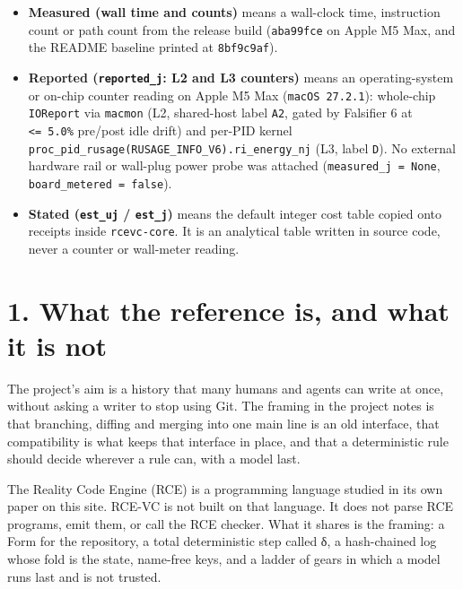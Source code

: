 \documentclass[10pt,letterpaper]{article}
\providecommand{\tightlist}{\setlength{\itemsep}{1pt}\setlength{\parskip}{0pt}}
\begin{document}
\begin{itemize}
\tightlist
\item
  \textbf{Measured (wall time and counts)} means a wall-clock time,
  instruction count or path count from the release build
  (\texttt{aba99fce} on Apple M5 Max, and the README baseline printed at
  \texttt{8bf9c9af}).
\item
  \textbf{Reported (\texttt{reported\_j}: L2 and L3 counters)} means an
  operating-system or on-chip counter reading on Apple M5 Max
  (\texttt{macOS\ 27.2.1}): whole-chip \texttt{IOReport} via
  \texttt{macmon} (L2, shared-host label \texttt{A2}, gated by Falsifier
  6 at \texttt{\textless{}=\ 5.0\%} pre/post idle drift) and per-PID
  kernel \texttt{proc\_\allowbreak{}pid\_\allowbreak{}rusage(\allowbreak{}RUSAGE\_\allowbreak{}INFO\_\allowbreak{}V6).\allowbreak{}ri\_\allowbreak{}energy\_\allowbreak{}nj}
  (L3, label \texttt{D}). No external hardware rail or wall-plug power
  probe was attached (\texttt{measured\_\allowbreak{}j\ =\ None},
  \texttt{board\_\allowbreak{}metered\ =\ false}).
\item
  \textbf{Stated (\texttt{est\_uj} / \texttt{est\_j})} means the default
  integer cost table copied onto receipts inside \texttt{rcevc-core}. It
  is an analytical table written in source code, never a counter or
  wall-meter reading.
\end{itemize}

\section{1. What the reference is, and what it is
not}\label{what-the-reference-is-and-what-it-is-not}

The project's aim is a history that many humans and agents can write at
once, without asking a writer to stop using Git. The framing in the
project notes is that branching, diffing and merging into one main line
is an old interface, that compatibility is what keeps that interface in
place, and that a deterministic rule should decide wherever a rule can,
with a model last.

The Reality Code Engine (RCE) is a programming language studied in its
own paper on this site. RCE-VC is not built on that language. It does
not parse RCE programs, emit them, or call the RCE checker. What it
shares is the framing: a Form for the repository, a total deterministic
step called δ, a hash-chained log whose fold is the state, name-free
keys, and a ladder of gears in which a model runs last and is not
trusted.
\end{document}
